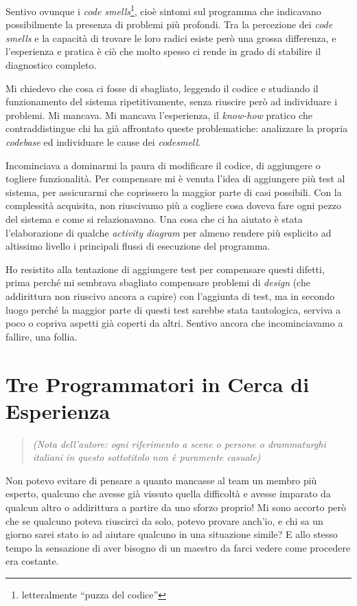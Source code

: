 \documentclass[12pt]{report}
\begin{document}
Sentivo ovunque i \textit{code smells}\footnote{
letteralmente ``puzza del codice''}, cioè sintomi sul programma che indicavano 
possibilmente la presenza di problemi più profondi. Tra la percezione dei 
\textit{code smells} e la capacità di trovare le loro radici esiste però una
grossa differenza, e l'esperienza e pratica è ciò che molto spesso ci rende
in grado di stabilire il diagnostico completo.

Mi chiedevo che cosa ci fosse di sbagliato, leggendo il codice e studiando il 
funzionamento del sistema ripetitivamente, senza riuscire però
ad individuare i problemi. Mi mancava. Mi mancava l'esperienza, 
il \textit{know-how} pratico che contraddistingue chi ha già affrontato
queste problematiche: analizzare la propria \textit{codebase} 
ed individuare le cause dei \textit{codesmell}.

Incominciava a dominarmi la paura di modificare il codice, di aggiungere o 
togliere funzionalità. Per compensare mi è venuta l'idea di aggiungere più test
al sistema, per assicurarmi che coprissero la maggior parte di casi possibili.
Con la complessità acquisita, non riuscivamo più a cogliere cosa doveva fare 
ogni pezzo del sistema e come si relazionavano. Una cosa che ci ha aiutato è
stata l'elaborazione di qualche \textit{activity diagram} per almeno rendere 
più esplicito ad altissimo livello i principali flussi di esecuzione 
del programma. 

Ho resistito alla tentazione di aggiungere test per compensare questi difetti,
prima perché mi sembrava sbagliato compensare problemi di \textit{design} (che
addirittura non riuscivo ancora a capire) con l'aggiunta
di test, ma in secondo luogo perché la maggior parte di questi test 
sarebbe stata tautologica, serviva a poco o copriva aspetti già coperti da 
altri. Sentivo ancora che incominciavamo a fallire, una follia.

\section{Tre Programmatori in Cerca di Esperienza}

\begin{quote}
\textit{
(Nota dell'autore: ogni riferimento a scene o persone o drammaturghi italiani
in questo sottotitolo non è puramente casuale)
}
\end{quote}

Non potevo evitare di pensare a quanto mancasse al team un membro più esperto,
qualcuno che avesse già vissuto quella difficoltà e avesse imparato 
da qualcun altro o addirittura a partire da uno sforzo proprio! 
Mi sono accorto però che se qualcuno poteva riuscirci da solo, potevo provare
anch'io, e chi sa un giorno sarei stato io ad aiutare qualcuno in una situazione 
simile? E allo stesso tempo la sensazione di aver bisogno di un maestro da farci
vedere come procedere era costante.
\end{document}
